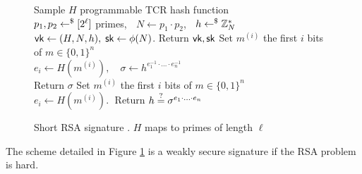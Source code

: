 \begin{figure}[htb]
\centering
\begin{pcvstack}
		{
			Sample $H$ programmable TCR hash function
				\\
			$p_1, p_2 \gets^{\$} {[2^\ell]}$ primes, $\;$ $N \gets p_1 \cdot p_2$, $\;$ $h \gets^{\$} \mathbb{Z}_N^\ast$
				\\
			$\vk \gets (H, N, h), \; \sk \gets \phi(N)$. Return $\vk, \sk$
		}
		{
			Set $m^{(i)}$ the first $i$ bits of $m \in \{0, 1\}^n$
				\\
			$e_i \gets H(m^{(i)}), \quad \sigma \gets h^{e_1^{-1} \cdot \ldots \cdot e_n^{-1}}$
				\\
			Return $\sigma$
		}
		{
			Set $m^{(i)}$ the first $i$ bits of $m \in \{0, 1\}^n$
				\\
			$e_i \gets H(m^{(i)}). \;$ Return $h \stackrel{?}{=} \sigma^{e_1 \cdot \ldots \cdot e_n}$
		}
\end{pcvstack}
\label{prot:HohWat09}
\caption{Short RSA signature \cite{C:HohWat09}. $H$ maps to primes of length $\ell$}
\end{figure}

\begin{proposition}
	\label{prop:HohWat09}
	The scheme detailed in Figure \ref{prot:HohWat09} is a weakly secure signature if the RSA problem is hard.
\end{proposition}

